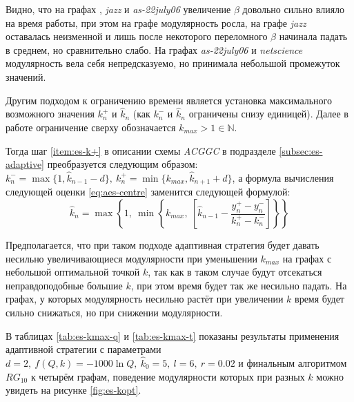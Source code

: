 Видно, что на графах \emph{\celegans}, \emph{jazz} и \emph{as-22july06} увеличение $\beta$ довольно сильно влияло на время работы, при этом на графе \emph{\celegans} модулярность росла, на графе \emph{jazz} оставалась неизменной и лишь после некоторого переломного $\beta$ начинала падать в среднем, но сравнительно слабо. На графах \emph{as-22july06} и \emph{netscience} модулярность вела себя непредсказуемо, но принимала небольшой промежуток значений.

Другим подходом к ограничению времени является установка максимального возможного значения $k_n^{+}$ и $\hat{k}_n$ (как $k_n^{-}$ и $\hat{k}_n$ ограничены снизу единицей). Далее в работе ограничение сверху обозначается $k_{max} > 1 \in \mathbb{N}$.

Тогда шаг \ref{item:es-k+} в описании схемы \emph{ACGGC} в подразделе \ref{subsec:es-adaptive} преобразуется следующим образом: $k_n^{-} = \max\{1, \hat{k}_{n - 1} - d\},\ k_n^{+} = \min \{k_{max}, \hat{k}_{n + 1} + d\}$, а формула вычисления следующей оценки \eqref{eq:aes-centre} заменится следующей формулой:
\begin{equation}
	\hat{k}_n = \max \left\{1,\ \min \left\{k_{max},\ \left[\hat{k}_{n - 1} - \frac{y_n^{+} - y_n^{-}}{k_n^{+} - k_n^{-}}\right] \right\} \right\}
\end{equation}

Предполагается, что при таком подходе адаптивная стратегия будет давать несильно увеличивающиеся модулярности при уменьшении $k_{max}$ на графах с небольшой оптимальной точкой $k$, так как в таком случае будут отсекаться неправдоподобные большие $k$, при этом время будет так же несильно падать. На графах, у которых модулярность несильно растёт при увеличении $k$ время будет сильно снижаться, но при снижении модулярности.

В таблицах \ref{tab:es-kmax-q} и \ref{tab:es-kmax-t} показаны результаты применения адаптивной стратегии с параметрами $d = 2,\ f(Q, k) = -1000 \ln Q,\ \hat{k}_0 = 5,\ l = 6,\ r = 0.02$ и финальным алгоритмом $RG_{10}$ к четырём графам, поведение модулярности которых при разных $k$ можно увидеть на рисунке \ref{fig:es-kopt}.

